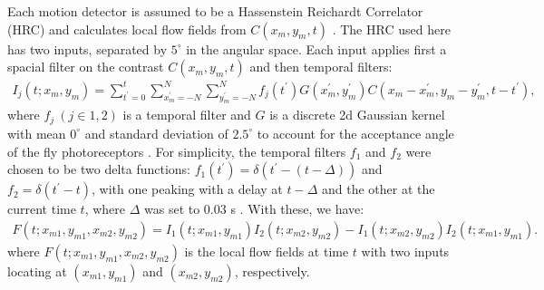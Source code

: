 \documentclass[9pt,lineno]{elife}
\begin{document}
Each motion detector is assumed to be a Hassenstein Reichardt Correlator (HRC) and calculates local flow fields from $C(x_{m},y_{m},t)$ \citep{hassenstein1956systemtheoretische}. The HRC used here has two inputs, separated by $5^{\circ}$ in the angular space. Each input applies first a spacial filter on the contrast $C(x_{m},y_{m},t)$ and then temporal filters:
\begin{align}
I_{j}(t;x_{m},y_{m}) = \sum_{t^{'}=0}^{t}\sum_{x^{'}_{m}=-N}^{N}\sum_{y^{'}_{m}=-N}^{N}f_{j}(t^{'})G(x^{'}_{m},y^{'}_{m})C(x_{m}-x^{'}_{m},y_{m}-y^{'}_{m},t-t^{'}),
\end{align}
where $f_{j}\ (j \in {1,2})$ is a temporal filter and $G$ is a discrete 2d Gaussian kernel with mean $0^{\circ}$ and standard deviation of $2.5^{\circ}$ to account for the acceptance angle of the fly photoreceptors \citep{stavenga2003angular}. For simplicity, the temporal filters $f_{1}$ and $f_{2}$ were chosen to be two delta functions: $f_{1}(t^{'})=\delta (t^{'}-(t-\Delta))$ and $f_{2}=\delta (t^{'}-t)$, with one peaking with a delay at $t-\Delta$ and the other at the current time $t$, where $\Delta$ was set to 0.03 s \citep{salazar2016direct}. With these, we have:
\begin{align}\label{eq:HRC}
F(t;x_{m1},y_{m1},x_{m2},y_{m2}) = I_{1}(t;x_{m1},y_{m1})I_{2}(t;x_{m2},y_{m2})-I_{1}(t;x_{m2},y_{m2})I_{2}(t;x_{m1},y_{m1}).
\end{align}
where $F(t;x_{m1},y_{m1},x_{m2},y_{m2})$ is the local flow fields at time $t$ with two inputs locating at $(x_{m1},y_{m1})$ and $(x_{m2},y_{m2})$, respectively.   
\end{document}

